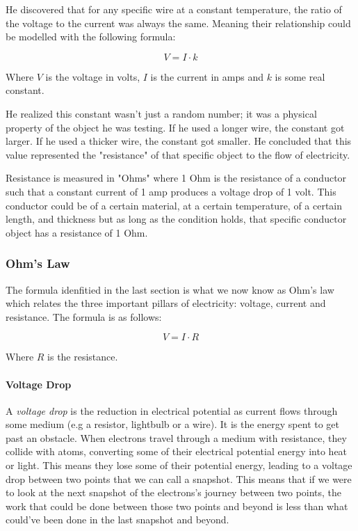 \documentclass{article}
\begin{document}
He discovered that for any specific wire at a constant temperature, the ratio of the voltage to the current was always the same. Meaning their relationship could be modelled with the following formula:

$$V = I \cdot k$$

Where $V$ is the voltage in volts, $I$ is the current in amps and $k$ is some real constant.

He realized this constant wasn't just a random number; it was a physical property of the object he was testing. If he used a longer wire, the constant got larger. If he used a thicker wire, the constant got smaller. He concluded that this value represented the "resistance" of that specific object to the flow of electricity.

Resistance is measured in "Ohms" where 1 Ohm is the resistance of a conductor such that a constant current of 1 amp produces a voltage drop of 1 volt. This conductor could be of a certain material, at a certain temperature, of a certain length, and thickness but as long as the condition holds, that specific conductor object has a resistance of 1 Ohm.

\subsubsection{Ohm's Law}

The formula idenfitied in the last section is what we now know as Ohm's law which relates the three important pillars of electricity: voltage, current and resistance. The formula is as follows:

$$V = I \cdot R$$

Where $R$ is the resistance.

\paragraph{Voltage Drop}

A \emph{voltage drop} is the reduction in electrical potential as current flows through some medium (e.g a resistor, lightbulb or a wire). It is the energy spent to get past an obstacle. When electrons travel through a medium with resistance, they collide with atoms, converting some of their electrical potential energy into heat or light. This means they lose some of their potential energy, leading to a voltage drop between two points that we can call a snapshot. This means that if we were to look at the next snapshot of the electrons's journey between two points, the work that could be done between those two points and beyond is less than what could've been done in the last snapshot and beyond. 
\end{document}
